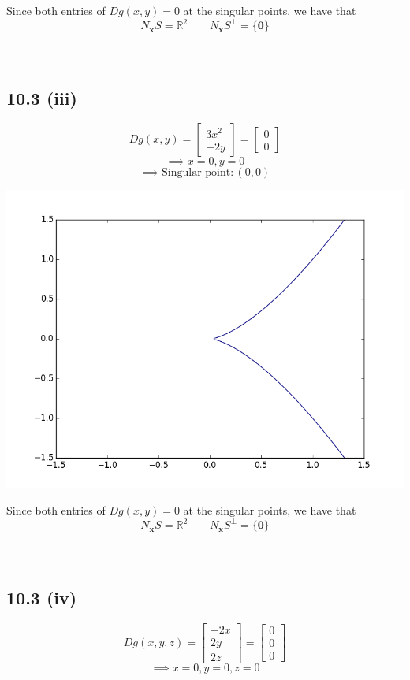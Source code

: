 \documentclass[letterpaper,12pt]{article}
\theoremstyle{definition}
\begin{document}
Since both entries of $Dg(x,y) = 0$ at the singular points, we have that \[N_{\mathbf{x}}S = \mathbb{R}^2 \qquad N_{\mathbf{x}}S^{\perp} = \{\mathbf{0}\}\]
\\\\

\subsection*{10.3 (iii)}
\[ Dg(x,y) = \begin{bmatrix}
3x^2 \\
-2y 
\end{bmatrix}
= \begin{bmatrix}
0 \\
0 
\end{bmatrix} \]
\[ \implies x = 0, y = 0 \]
\[ \implies \text{Singular point}:(0,0)\]

\includegraphics[scale = .75]{3iii}

Since both entries of $Dg(x,y) = 0$ at the singular points, we have that \[N_{\mathbf{x}}S = \mathbb{R}^2 \qquad N_{\mathbf{x}}S^{\perp} = \{\mathbf{0}\}\]
\\\\

\subsection*{10.3 (iv)}
\[ Dg(x,y,z) = \begin{bmatrix}
-2x \\
2y \\
2z 
\end{bmatrix} 
= \begin{bmatrix}
0 \\
0 \\
0 
\end{bmatrix} \]
\[ \implies x=0, y=0, z=0 \]
\end{document}
